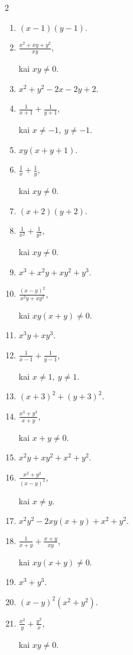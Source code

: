 \documentclass[11pt,a4paper]{article}
\begin{document}
\begin{multicols}{2}
\begin{enumerate}[start=1]
\item \(\displaystyle (x-1)(y-1)\).
\item \(\displaystyle \frac{x^2+xy+y^2}{xy}\),\par\nopagebreak\smallskip kai \(xy\ne0\).
\item \(\displaystyle x^2+y^2-2x-2y+2\).
\item \(\displaystyle \frac1{x+1}+\frac1{y+1}\),\par\nopagebreak\smallskip kai \(x\ne-1,\ y\ne-1\).
\item \(\displaystyle xy(x+y+1)\).
\item \(\displaystyle \frac1x+\frac1y\),\par\nopagebreak\smallskip kai \(xy\ne0\).
\item \(\displaystyle (x+2)(y+2)\).
\item \(\displaystyle \frac1{x^2}+\frac1{y^2}\),\par\nopagebreak\smallskip kai \(xy\ne0\).
\item \(\displaystyle x^3+x^2y+xy^2+y^3\).
\item \(\displaystyle \frac{(x-y)^2}{x^2y+xy^2}\),\par\nopagebreak\smallskip kai \(xy(x+y)\ne0\).
\item \(\displaystyle x^3y+xy^3\).
\item \(\displaystyle \frac1{x-1}+\frac1{y-1}\),\par\nopagebreak\smallskip kai \(x\ne1,\ y\ne1\).
\item \(\displaystyle (x+3)^2+(y+3)^2\).
\item \(\displaystyle \frac{x^3+y^3}{x+y}\),\par\nopagebreak\smallskip kai \(x+y\ne0\).
\item \(\displaystyle x^2y+xy^2+x^2+y^2\).
\item \(\displaystyle \frac{x^2+y^2}{(x-y)^2}\),\par\nopagebreak\smallskip kai \(x\ne y\).
\item \(\displaystyle x^2y^2-2xy(x+y)+x^2+y^2\).
\item \(\displaystyle \frac1{x+y}+\frac{x+y}{xy}\),\par\nopagebreak\smallskip kai \(xy(x+y)\ne0\).
\item \(\displaystyle x^3+y^3\).
\item \(\displaystyle (x-y)^2(x^2+y^2)\).
\item \(\displaystyle \frac{x^2}{y}+\frac{y^2}{x}\),\par\nopagebreak\smallskip kai \(xy\ne0\).

\end{enumerate}
\end{multicols}
\end{document}
